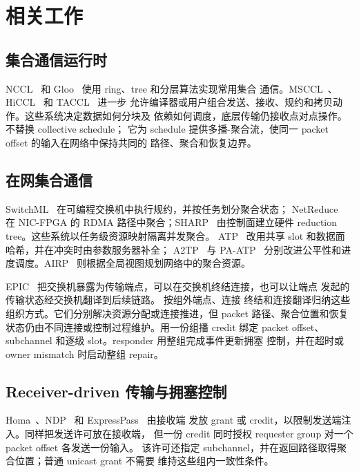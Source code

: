 \chapter{相关工作}
\label{chap:related}

\section{集合通信运行时}

NCCL~\cite{nccl} 和 Gloo~\cite{gloo} 使用 ring、tree 和分层算法实现常用集合
通信。MSCCL~\cite{msccl}、HiCCL~\cite{hiccl} 和 TACCL~\cite{taccl} 进一步
允许编译器或用户组合发送、接收、规约和拷贝动作。这些系统决定数据如何分块及
依赖如何调度，底层传输仍接收点对点操作。\sysname 不替换 collective schedule；
它为 schedule 提供多播-聚合流，使同一 packet offset 的输入在网络中保持共同的
路径、聚合和恢复边界。

\section{在网集合通信}

SwitchML~\cite{switchml} 在可编程交换机中执行规约，并按任务划分聚合状态；
NetReduce~\cite{netreduce} 在 NIC-FPGA 的 RDMA 路径中聚合；SHARP~\cite{sharp}
由控制面建立硬件 reduction tree。这些系统以任务级资源映射隔离并发聚合。
ATP~\cite{atp} 改用共享 slot 和数据面哈希，并在冲突时由参数服务器补全；
A2TP~\cite{a2tp} 与 PA-ATP~\cite{paatp} 分别改进公平性和进度调度。AIRP~
\cite{airp} 则根据全局视图规划网络中的聚合资源。

EPIC~\cite{epic} 把交换机暴露为传输端点，可以在交换机终结连接，也可以让端点
发起的传输状态经交换机翻译到后续链路。 按组外端点、连接
终结和连接翻译归纳这些组织方式。它们分别解决资源分配或连接推进，但 packet
路径、聚合位置和恢复状态仍由不同连接或控制过程维护。\sysname 用一份组播 credit
绑定 packet offset、subchannel 和逐级 slot。responder 用整组完成事件更新拥塞
控制，并在超时或 owner mismatch 时启动整组 repair。

\section{Receiver-driven 传输与拥塞控制}

Homa~\cite{homa}、NDP~\cite{ndp} 和 ExpressPass~\cite{expresspass} 由接收端
发放 grant 或 credit，以限制发送端注入。\sysname 同样把发送许可放在接收端，
但一份 credit 同时授权 requester group 对一个 packet offset 各发送一份输入。
该许可还指定 subchannel，并在返回路径取得聚合位置；普通 unicast grant 不需要
维持这些组内一致性条件。

